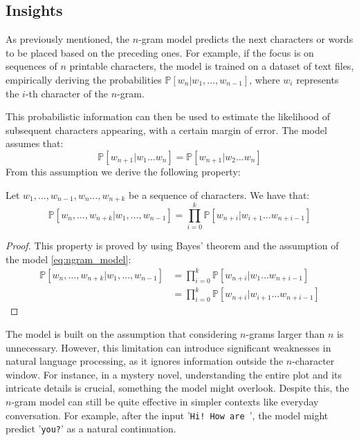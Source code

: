 \subsection{Insights}
As previously mentioned, the $n$-gram model predicts the next characters or words to be placed based on the preceding ones. For example, if the focus is on sequences of $n$ printable characters, the model is trained on a dataset of text files, empirically deriving the probabilities $\mathbb{P}\left[w_n|w_1,\dots,w_{n-1}\right]$, where $w_i$ represents the $i$-th character of the $n$-gram.

\noindent This probabilistic information can then be used to estimate the likelihood of subsequent characters appearing, with a certain margin of error. The model assumes that:
\begin{equation}
	\mathbb{P}\left[w_{n+1}|w_1\dots w_n\right] = \mathbb{P}\left[w_{n+1}|w_2\dots w_n\right]
	\label{eq:ngram_model}
\end{equation}
From this assumption we derive the following property:
\begin{proposition}
	Let $w_1,\dots,w_{n-1},w_n\dots,w_{n+k}$ be a sequence of characters. We have that:
\begin{equation}
	\mathbb{P}\left[w_n,\dots,w_{n+k}|w_1,\dots,w_{n-1}\right] = \prod_{i=0}^{k}\mathbb{P}\left[w_{n+i}|w_{i+1}\dots w_{n+i-1}\right]
	\label{eq:ngram_model_prop}
\end{equation}
\end{proposition}

\begin{proof}
	This property is proved by using Bayes' theorem and the assumption of the model \cref{eq:ngram_model}:
\begin{align*}
	\mathbb{P}\left[w_n,\dots,w_{n+k}|w_1,\dots,w_{n-1}\right] &= \prod_{i=0}^{k}\mathbb{P}\left[w_{n+i}|w_1\dots w_{n+i-1}\right] \\
	&= \prod_{i=0}^{k}\mathbb{P}\left[w_{n+i}|w_{i+1}\dots w_{n+i-1}\right]
\end{align*}
\end{proof}

\noindent The model is built on the assumption that considering $n$-grams larger than $n$ is unnecessary. However, this limitation can introduce significant weaknesses in natural language processing, as it ignores information outside the $n$-character window. For instance, in a mystery novel, understanding the entire plot and its intricate details is crucial, something the model might overlook. Despite this, the $n$-gram model can still be quite effective in simpler contexts like everyday conversation. For example, after the input '\texttt{Hi! How are }', the model might predict '\texttt{you?}' as a natural continuation.

